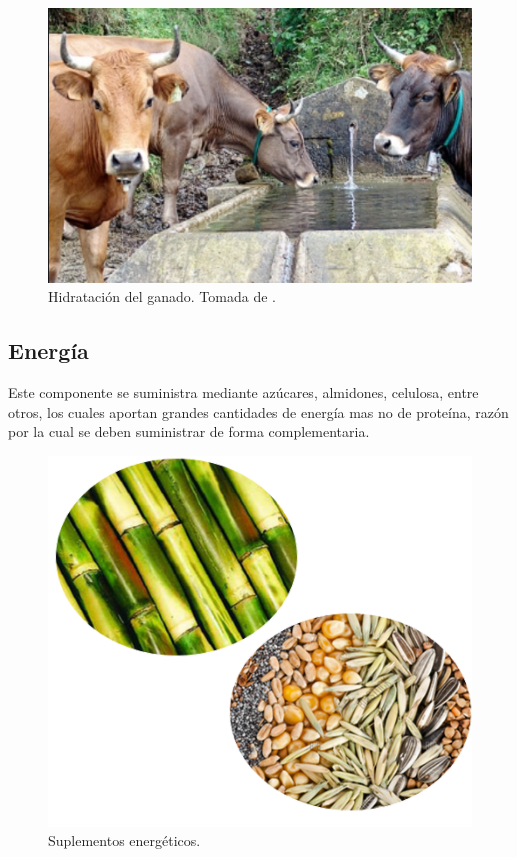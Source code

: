 	\begin{figure}[H]
	 \begin{center}
	 \includegraphics[scale=0.8]{img/agua.png}
	 \end{center}
	 \caption{Hidratación del ganado. Tomada de \cite{contextoganadero}.	\label{energeticospng}}
	\end{figure}
    	
\subsection{Energía}
Este componente se suministra mediante azúcares, almidones, celulosa, entre otros, los cuales aportan grandes cantidades de energía mas no de proteína, razón por la cual se deben suministrar de forma complementaria.
	\begin{figure}[H]
	 \begin{center}
	 \includegraphics[scale=0.7]{img/melazacana.png}
	 \end{center}
	 \caption{Suplementos energéticos. 	\label{energeticospng}}
	\end{figure}
    
